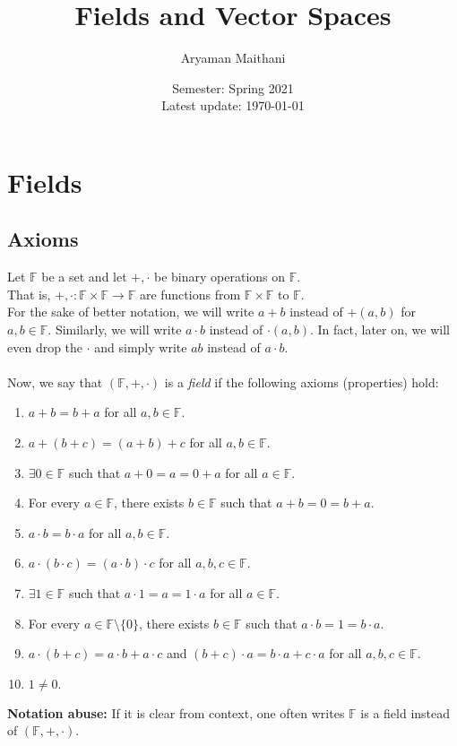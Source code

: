 \documentclass[12pt]{article}
\title{Fields and Vector Spaces}
\author{Aryaman Maithani}%
\date{Semester: Spring 2021\\ Latest update: \today}
\begin{document}
\maketitle

\section{Fields}
\subsection{Axioms}

Let $\mathbb{F}$ be a set and let $+, \cdot$ be binary operations on $\mathbb{F}.$\\
That is, $+, \cdot:\mathbb{F}\times\mathbb{F}\to\mathbb{F}$ are functions from $\mathbb{F}\times\mathbb{F}$ to $\mathbb{F}$.\\
For the sake of better notation, we will write $a + b$ instead of $+(a, b)$ for $a, b \in \mathbb{F}.$ Similarly, we will write $a\cdot b$ instead of $\cdot(a, b).$ In fact, later on, we will even drop the $\cdot$ and simply write $ab$ instead of $a\cdot b.$\\~\\
Now, we say that $(\mathbb{F}, +, \cdot)$ is a \emph{field} if the following axioms (properties) hold:
\begin{enumerate}[label = (A\arabic*)] 
	\item $a + b = b + a$ for all $a, b \in \mathbb{F}.$
	\item $a + (b + c) = (a + b) + c$ for all $a, b \in \mathbb{F}.$
	\item $\exists 0 \in \mathbb{F}$ such that $a + 0 = a = 0 + a$ for all $a \in \mathbb{F}.$
	\item For every $a \in \mathbb{F}$, there exists $b \in \mathbb{F}$ such that $a + b = 0 = b + a.$
	\item $a \cdot b = b \cdot a$ for all $a, b \in \mathbb{F}.$
	\item $a \cdot (b \cdot c) = (a \cdot b) \cdot c$ for all $a, b, c \in \mathbb{F}.$
	\item $\exists 1 \in \mathbb{F}$ such that $a \cdot 1 = a = 1 \cdot a$ for all $a\in \mathbb{F}.$
	\item For every $a \in \mathbb{F}\setminus\{0\}$, there exists $b \in \mathbb{F}$ such that $a \cdot b = 1 = b \cdot a.$
	\item $a\cdot(b + c) = a\cdot b + a\cdot c$ and $(b + c)\cdot a = b\cdot a + c \cdot a$ for all $a, b, c \in \mathbb{F}.$
	\item $1 \neq 0.$

\end{enumerate}
\textbf{Notation abuse:} If it is clear from context, one often writes $\mathbb{F}$ is a field instead of $(\mathbb{F}, +, \cdot).$
\end{document}
